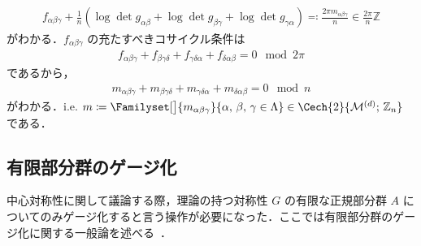 \documentclass[TQFT_main]{subfiles}
\begin{document}
\begin{align}
    f_{\alpha\beta\gamma} + \frac{1}{n} \left( \log \det g_{\alpha\beta} + \log \det g_{\beta\gamma} + \log \det g_{\gamma\alpha}\right) \eqqcolon \frac{2\pi m_{\alpha\beta\gamma}}{n} \in \frac{2\pi}{n} \mathbb{Z}
\end{align}
がわかる．$f_{\alpha\beta\gamma}$ の充たすべきコサイクル条件は
\begin{align}
    f_{\alpha\beta\gamma} + f_{\beta\gamma\delta} + f_{\gamma\delta\alpha} + f_{\delta\alpha\beta} = 0 \mod 2\pi
\end{align}
であるから，
\begin{align}
    m_{\alpha\beta\gamma} + m_{\beta\gamma\delta} + m_{\gamma\delta\alpha} + m_{\delta\alpha\beta} = 0 \mod n
\end{align}
がわかる．i.e. $m \coloneqq \Familyset[\big]{m_{\alpha\beta\gamma}}{\alpha,\,\beta,\,\gamma \in \Lambda} \in \Cech{2}{\mfdcal{M}{d};\, \mathbb{Z}_n}$ である．


\subsection{有限部分群のゲージ化}

中心対称性に関して議論する際，理論の持つ対称性 $G$ の有限な正規部分群 $A$ についてのみゲージ化すると言う操作が必要になった．ここでは有限部分群のゲージ化に関する一般論を述べる~\cite{Tachikawa2017gauging}．
\end{document}
